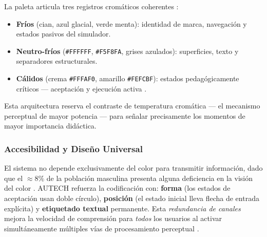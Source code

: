 La paleta articula tres registros cromáticos coherentes \cite{holtzschue2017}:
\begin{itemize}
  \item \textbf{Fríos} (cian, azul glacial, verde menta): identidad de marca, navegación y
        estados pasivos del simulador.
  \item \textbf{Neutro-fríos} (\texttt{\#FFFFFF}, \texttt{\#F5F8FA}, grises azulados):
        superficies, texto y separadores estructurales.
  \item \textbf{Cálidos} (crema \texttt{\#FFFAF0}, amarillo \texttt{\#FEFCBF}): estados
        pedagógicamente críticos — aceptación y ejecución activa \cite{heller2004}.
\end{itemize}
Esta arquitectura reserva el contraste de temperatura cromática — el mecanismo perceptual de mayor
potencia — para señalar precisamente los momentos de mayor importancia didáctica.

\subsubsection*{Accesibilidad y Diseño Universal}

El sistema no depende exclusivamente del color para transmitir información, dado que el
$\approx 8\%$ de la población masculina presenta alguna deficiencia en la visión del color
\cite{lidwell2010}. AUTECH refuerza la codificación con:
\textbf{forma} (los estados de aceptación usan doble círculo),
\textbf{posición} (el estado inicial lleva flecha de entrada explícita) y
\textbf{etiquetado textual} permanente.
Esta \emph{redundancia de canales} mejora la velocidad de comprensión para \emph{todos} los
usuarios al activar simultáneamente múltiples vías de procesamiento perceptual \cite{tidwell2020}.